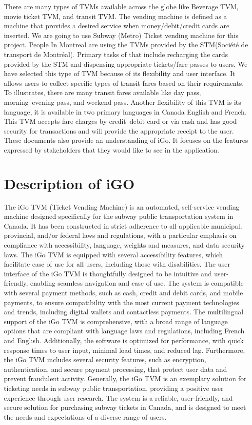 \documentclass[a4paper,12pt]{report}
\begin{document}
There are many types of TVMs available across the globe like Beverage TVM, movie ticket TVM, and transit TVM. The vending machine is defined as a machine that provides a desired service when money/debit/credit cards are inserted. We are going to use Subway (Metro) Ticket vending machine for this project. People In Montreal are using the TVMs provided by the STM(Société de transport de Montréal). Primary tasks of that include recharging the cards provided by the STM and dispensing appropriate tickets/fare passes to users. We have selected this type of TVM because of its flexibility and user interface. It allows users to collect specific types of transit fares based on their requirements. To illustrates, there are many transit fares available like day pass, morning\ evening pass, and weekend pass. Another flexibility of this TVM is its language, it is available in two primary languages in Canada English and French. This TVM accepts fare charges by credit\ debit card or via cash and has good security for transactions and will provide the appropriate receipt to the user. These documents also provide an understanding of iGo. It focuses on the features expressed by stakeholders that they would like to see in the application.\\ [0.1in]

\section{Description of iGO}
The iGo TVM (Ticket Vending Machine) is an automated, self-service vending machine designed specifically for the subway public transportation system in Canada. It has been constructed in strict adherence to all applicable municipal, provincial, and/or federal laws and regulations, with a particular emphasis on compliance with accessibility, language, weights and measures, and data security laws. The iGo TVM is equipped with several accessibility features, which facilitate ease of use for all users, including those with disabilities. The user interface of the iGo TVM is thoughtfully designed to be intuitive and user-friendly, enabling seamless navigation and ease of use. The system is compatible with several payment methods, such as cash, credit and debit cards, and mobile payments, to ensure compatibility with the most current payment technologies and trends, including digital wallets and contactless payments. The multilingual support of the iGo TVM is comprehensive, with a broad range of language options that are compliant with language laws and regulations, including French and English. Additionally, the software is optimized for performance, with quick response times to user input, minimal load times, and reduced lag. Furthermore, the iGo TVM includes several security features, such as encryption, authentication, and secure payment processing, that protect user data and prevent fraudulent activity. Generally, the iGo TVM is an exemplary solution for ticketing needs in subway public transportation, providing a positive user experience through user research. The system is a reliable, user-friendly, and secure solution for purchasing subway tickets in Canada, and is designed to meet the needs and expectations of a diverse range of users.
\end{document}
